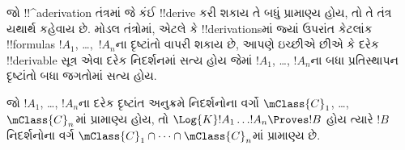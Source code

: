 \documentclass[../../../include/open-logic-section]{subfiles}
\begin{document}


જો !!^a{derivation} તંત્રમાં જે કંઈ !!{derive} કરી શકાય તે બધું
પ્રામાણ્ય હોય, તો તે તંત્ર યથાર્થ કહેવાય છે. મોડલ તંત્રોમાં, એટલે કે
!!{derivation}sમાં જ્યાં  ઉપરાંત કેટલાંક !!{formula}s $!A_1$,
\dots,~$!A_n$ના દૃષ્ટાંતો વાપરી શકાય છે, આપણે ઇચ્છીએ છીએ કે દરેક
!!{derivable} સૂત્ર એવા દરેક નિદર્શનમાં સત્ય હોય જેમાં $!A_1$,
\dots, $!A_n$ના બધા પ્રતિસ્થાપન દૃષ્ટાંતો બધા જગતોમાં સત્ય હોય.

\begin{thm}[યથાર્થતાનું પ્રમેય]
  જો $!A_1$, \dots, $!A_n$ના દરેક દૃષ્ટાંત અનુક્રમે નિદર્શનોના
  વર્ગો $\mClass{C}_1$, \dots, $\mClass{C}_n$માં પ્રામાણ્ય હોય,
  તો $\Log{K}!A_1\dots !A_n
  \Proves !B$ હોય ત્યારે $!B$ નિદર્શનોના વર્ગ
  $\mClass{C}_1 \cap \dots \cap \mClass{C}_n$માં પ્રામાણ્ય છે.
\end{thm}
\end{document}
